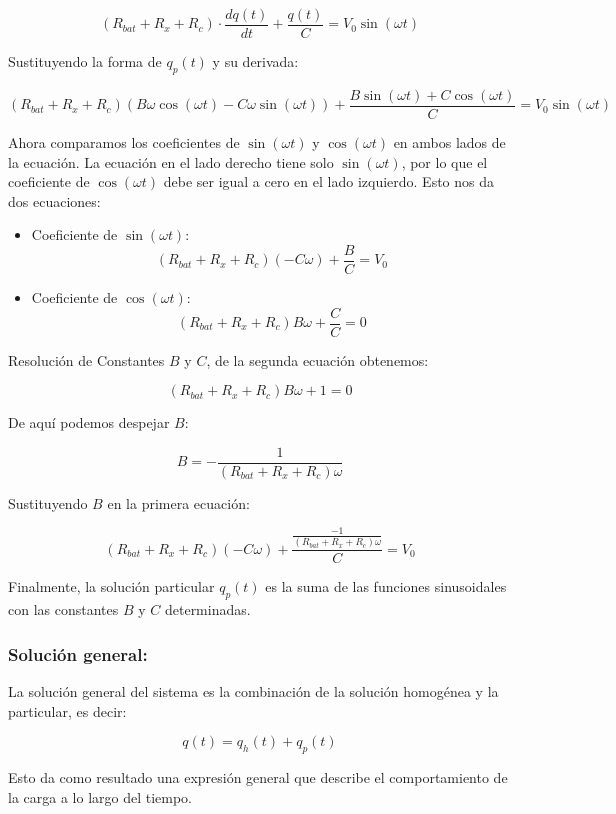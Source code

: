 \[
	(R_{bat} + R_x + R_c) \cdot \frac{dq(t)}{dt} + \frac{q(t)}{C} = V_0 \sin(\omega t)
\]

Sustituyendo la forma de \( q_p(t) \) y su derivada:

\[
	(R_{bat} + R_x + R_c)(B\omega \cos(\omega t) - C\omega \sin(\omega t)) + \frac{B \sin(\omega t) + C \cos(\omega t)}{C} = V_0 \sin(\omega t)
\]

Ahora comparamos los coeficientes de \( \sin(\omega t) \) y \( \cos(\omega t) \) en ambos lados de la ecuación. La
ecuación en el lado derecho tiene solo \( \sin(\omega t) \), por lo que el coeficiente de \( \cos(\omega t) \) debe ser
igual a cero en el lado izquierdo. Esto nos da dos ecuaciones:

\begin{itemize}
	\item Coeficiente de \( \sin(\omega t) \):
	      \[
		      (R_{bat} + R_x + R_c)(-C\omega) + \frac{B}{C} = V_0
	      \]

	\item Coeficiente de \( \cos(\omega t) \):
	      \[
		      (R_{bat} + R_x + R_c) B\omega + \frac{C}{C} = 0
	      \]
\end{itemize}

Resolución de Constantes \( B \) y \( C \), de la segunda ecuación obtenemos:

\[
	(R_{bat} + R_x + R_c) B\omega + 1 = 0
\]

De aquí podemos despejar \( B \):

\[
	B = -\frac{1}{(R_{bat} + R_x + R_c) \omega}
\]

Sustituyendo \( B \) en la primera ecuación:

\[
	(R_{bat} + R_x + R_c)(-C\omega) +  \frac{\frac{-1}{(R_{bat} + R_x + R_c) \omega}}{C}  = V_0
\]

Finalmente, la solución particular \( q_p(t) \) es la suma de las funciones sinusoidales con las
constantes \( B \) y \( C \) determinadas.

\subsubsection*{Solución general:}
La solución general del sistema es la combinación de la solución homogénea y la particular,
es decir:

\[
	q(t) = q_h(t) + q_p(t)
\]

Esto da como resultado una expresión general que describe el comportamiento de la carga a lo
largo del tiempo.

